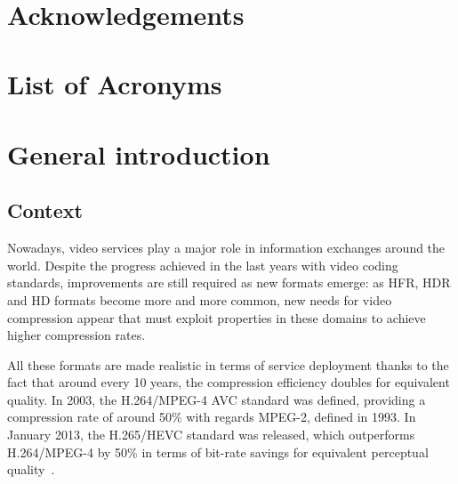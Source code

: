 \documentclass[11pt,a4paper,openright,twoside]{book}
\title{\Huge\bf\mytitle}
\author{\myauthor}
\def\useINSAcover{0} %
\numberwithin{equation}{section} %
\numberwithin{figure}{section} %
\numberwithin{table}{section} %
\begin{document}
\frontmatter
\ifthenelse{\useINSAcover = 1}
{
	
	\cleardoublepage
	
}{\maketitle}

\chapter*{Acknowledgements}
\label{cha:acknowledgements}

\tableofcontents
\cleardoublepage
\chapter*{List of Acronyms}
\label{cha:glossary}

\cleardoublepage
\listoffigures
\cleardoublepage
\listoftables
\cleardoublepage

\mainmatter

\chapter*{General introduction}
\label{cha:general_intoduction}

\section*{Context}
\label{sec:context}

Nowadays, video services play a major role in information exchanges around the
world.
Despite the progress achieved in the last years with video coding standards,
improvements are still required as new formats emerge:
as \ac{HFR}, \ac{HDR} and \ac{HD} formats become more and more common, new
needs for video compression appear that must exploit properties in these
domains to achieve higher compression rates.

All these formats are made realistic in terms of service deployment thanks to
the fact that around every 10 years, the compression efficiency doubles for
equivalent quality.
In 2003, the H.264/\acs{MPEG}-4 \acs{AVC} standard was defined, providing
a compression rate of around 50\% with regards \acs{MPEG}-2, defined
in 1993.
In January 2013, the H.265/\acs{HEVC} standard was released, which
outperforms H.264/\acs{MPEG}-4 by 50\% in terms of bit-rate savings for
equivalent perceptual quality~\cite{sullivan-12-overview-hevc}.
\end{document}
